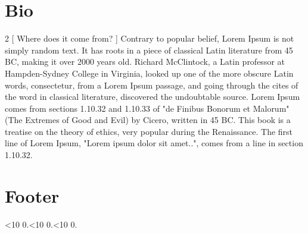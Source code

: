 \documentclass[a4paper,12pt]{article}
\def\twodigits#1{\ifnum#1<10 0\fi\the#1}
\def\mydate{\twodigits\day.\twodigits\month.\twodigits\year.}
\begin{document}
{  \section*{Bio}
  \begin{multicols}{2}
  [
    Where does it come from?
  ]    
Contrary to popular belief, Lorem Ipsum is not simply random text. It has roots in a piece of classical Latin literature from 45 BC, making it over 2000 years old. Richard McClintock, a Latin professor at Hampden-Sydney College in Virginia, looked up one of the more obscure Latin words, consectetur, from a Lorem Ipsum passage, and going through the cites of the word in classical literature, discovered the undoubtable source. Lorem Ipsum comes from sections 1.10.32 and 1.10.33 of "de Finibus Bonorum et Malorum" (The Extremes of Good and Evil) by Cicero, written in 45 BC. This book is a treatise on the theory of ethics, very popular during the Renaissance. The first line of Lorem Ipsum, "Lorem ipsum dolor sit amet..", comes from a line in section 1.10.32. 
  \end{multicols}


  \vfill
  \section*{Footer}
    \mydate
}
\end{document}
